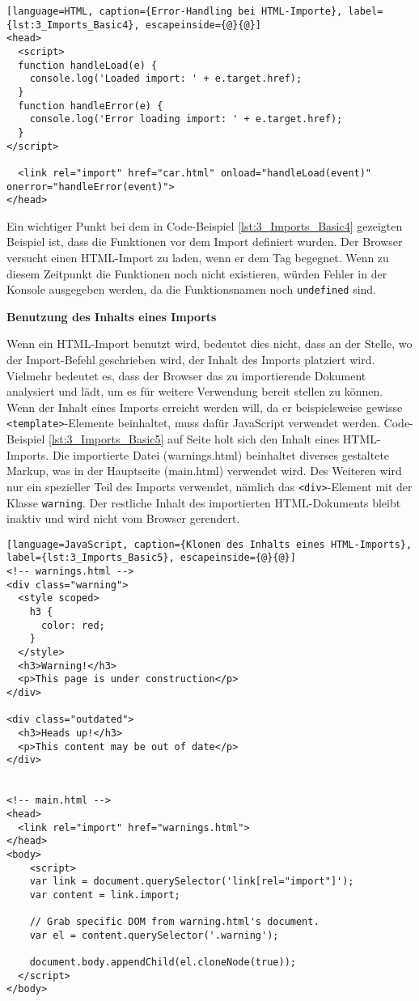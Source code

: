 \begin{lstlisting}[language=HTML, caption={Error-Handling bei HTML-Importe}, label={lst:3_Imports_Basic4}, escapeinside={@}{@}]
<head>
  <script>
  function handleLoad(e) {
    console.log('Loaded import: ' + e.target.href);
  }
  function handleError(e) {
    console.log('Error loading import: ' + e.target.href);
  }
</script>

  <link rel="import" href="car.html" onload="handleLoad(event)" onerror="handleError(event)">
</head>
\end{lstlisting}

Ein wichtiger Punkt bei dem in Code-Beispiel \ref{lst:3_Imports_Basic4} gezeigten Beispiel ist, dass die Funktionen vor dem Import definiert wurden. Der Browser versucht einen HTML-Import zu laden, wenn er dem Tag begegnet. Wenn zu diesem Zeitpunkt die Funktionen noch nicht existieren, würden Fehler in der Konsole ausgegeben werden, da die Funktionsnamen noch \lstinline|undefined| sind.

\textbf{Benutzung des Inhalts eines Imports}

Wenn ein HTML-Import benutzt wird, bedeutet dies nicht, dass an der Stelle, wo der Import-Befehl geschrieben wird, der Inhalt des Imports platziert wird. Vielmehr bedeutet es, dass der Browser das zu importierende Dokument analysiert und lädt, um es für weitere Verwendung bereit stellen zu können. Wenn der Inhalt eines Imports erreicht werden will, da er beispielsweise gewisse \lstinline|<template>|-Elemente beinhaltet, muss dafür JavaScript verwendet werden. Code-Beispiel \ref{lst:3_Imports_Basic5} auf Seite \pageref{lst:3_Imports_Basic5} holt sich den Inhalt eines HTML-Imports. Die importierte Datei (warnings.html) beinhaltet diverses gestaltete Markup, was in der Hauptseite (main.html) verwendet wird. Des Weiteren wird nur ein spezieller Teil des Imports verwendet, nämlich das \lstinline|<div>|-Element mit der Klasse \lstinline|warning|. Der restliche Inhalt des importierten HTML-Dokuments bleibt inaktiv und wird nicht vom Browser gerendert.

\begin{lstlisting}[language=JavaScript, caption={Klonen des Inhalts eines HTML-Imports}, label={lst:3_Imports_Basic5}, escapeinside={@}{@}]
<!-- warnings.html -->
<div class="warning">
  <style scoped>
    h3 {
      color: red;
    }
  </style>
  <h3>Warning!</h3>
  <p>This page is under construction</p>
</div>

<div class="outdated">
  <h3>Heads up!</h3>
  <p>This content may be out of date</p>
</div>


<!-- main.html -->
<head>
  <link rel="import" href="warnings.html">
</head>
<body>
    <script>
    var link = document.querySelector('link[rel="import"]');
    var content = link.import;

    // Grab specific DOM from warning.html's document.
    var el = content.querySelector('.warning');

    document.body.appendChild(el.cloneNode(true));
  </script>
</body>
\end{lstlisting}

